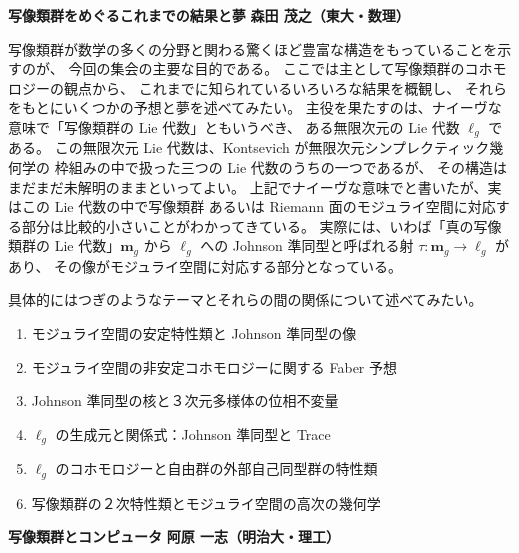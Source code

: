 \documentclass[uplatex,dvipdfmx]{jlreq}
\begin{document}
\newpage

\noindent
{\large\bfseries 写像類群をめぐるこれまでの結果と夢}
\hfill
{\large\bfseries 森田 茂之（東大・数理）}

\medskip

写像類群が数学の多くの分野と関わる驚くほど豊富な構造をもっていることを示すのが、
今回の集会の主要な目的である。
ここでは主として写像類群のコホモロジーの観点から、
これまでに知られているいろいろな結果を概観し、
それらをもとにいくつかの予想と夢を述べてみたい。
主役を果たすのは、ナイーヴな意味で「写像類群の Lie 代数」ともいうべき、
ある無限次元の Lie 代数 $\ell_g$ である。
この無限次元 Lie 代数は、Kontsevich が無限次元シンプレクティック幾何学の
枠組みの中で扱った三つの Lie 代数のうちの一つであるが、
その構造はまだまだ未解明のままといってよい。
上記でナイーヴな意味でと書いたが、実はこの Lie 代数の中で写像類群
あるいは Riemann 面のモジュライ空間に対応する部分は比較的小さいことがわかってきている。
実際には、いわば「真の写像類群の Lie 代数」$\mathbf{m}_g$ から $\ell_g$ への
Johnson 準同型と呼ばれる射 $\tau : \mathbf{m}_g \to \ell_g$ があり、
その像がモジュライ空間に対応する部分となっている。

具体的にはつぎのようなテーマとそれらの間の関係について述べてみたい。
\begin{enumerate}
  \setlength{\itemsep}{2pt}
  \item モジュライ空間の安定特性類と Johnson 準同型の像
  \item モジュライ空間の非安定コホモロジーに関する Faber 予想
  \item Johnson 準同型の核と３次元多様体の位相不変量
  \item $\ell_g$ の生成元と関係式：Johnson 準同型と Trace
  \item $\ell_g$ のコホモロジーと自由群の外部自己同型群の特性類
  \item 写像類群の２次特性類とモジュライ空間の高次の幾何学
\end{enumerate}

\newpage

\noindent
{\large\bfseries 写像類群とコンピュータ}
\hfill
{\large\bfseries 阿原 一志（明治大・理工）}
\end{document}
